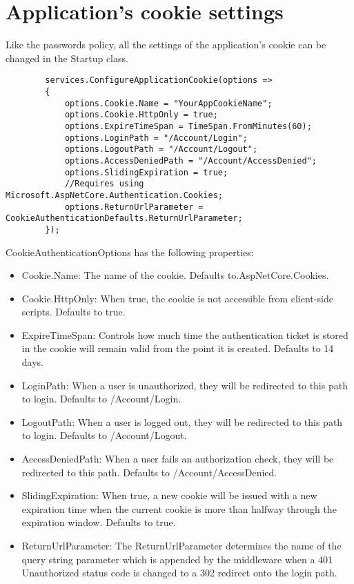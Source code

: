 \documentclass{report}
\begin{document}
    \section{Application's cookie settings}
    Like the passwords policy, all the settings of the application's cookie
    can be changed in the Startup class.
    \lstset{style=sharpc}
    \begin{lstlisting}
        services.ConfigureApplicationCookie(options =>
        {
            options.Cookie.Name = "YourAppCookieName";
            options.Cookie.HttpOnly = true;
            options.ExpireTimeSpan = TimeSpan.FromMinutes(60);
            options.LoginPath = "/Account/Login";
            options.LogoutPath = "/Account/Logout";
            options.AccessDeniedPath = "/Account/AccessDenied";
            options.SlidingExpiration = true;
            //Requires using Microsoft.AspNetCore.Authentication.Cookies;
            options.ReturnUrlParameter = CookieAuthenticationDefaults.ReturnUrlParameter;
        });
    \end{lstlisting}

    CookieAuthenticationOptions has the following properties:
    \begin{itemize}
        \item Cookie.Name: The name of the cookie. Defaults to.AspNetCore.Cookies.
        \item Cookie.HttpOnly: When true, the cookie is not accessible from
        client-side scripts. Defaults to true.
        \item ExpireTimeSpan: Controls how much time the authentication ticket
        is stored in the cookie will remain valid from the point it is created.
        Defaults to 14 days.
        \item LoginPath: When a user is unauthorized, they will be redirected
        to this path to login. Defaults to /Account/Login.
        \item LogoutPath: When a user is logged out, they will be redirected to
        this path to login. Defaults to /Account/Logout.
        \item AccessDeniedPath: When a user fails an authorization check, they
        will be redirected to this path. Defaults to /Account/AccessDenied.
        \item SlidingExpiration: When true, a new cookie will be issued with a
        new expiration time when the current cookie is more than halfway through
        the expiration window. Defaults to true.
        \item ReturnUrlParameter: The ReturnUrlParameter determines the name of
        the query string parameter which is appended by the middleware when a 401
        Unauthorized status code is changed to a 302 redirect onto the login path.
    \end{itemize}
\end{document}
